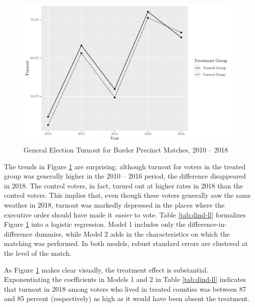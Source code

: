 \documentclass[
  12pt,
]{article}
\begin{document}
\begin{figure}[H]

{\centering \includegraphics{hurricane_michael_files/figure-latex/ll-to-1} 

}

\caption{\label{fig:ll-to}General Election Turnout for Border Precinct Matches, 2010 -- 2018}\label{fig:ll-to}
\end{figure}

The trends in Figure \ref{fig:ll-to} are surprising: although turnout for voters in the treated group was generally higher in the 2010 -- 2016 period, the difference disappeared in 2018. The control voters, in fact, turned out at higher rates in 2018 than the control voters. This implies that, even though these voters generally saw the same weather in 2018, turnout was markedly depressed in the places where the executive order should have made it \emph{easier} to vote. Table \ref{tab:dind-ll} formalizes Figure \ref{fig:ll-to} into a logistic regression. Model 1 includes only the difference-in-difference dummies, while Model 2 adds in the characteristics on which the matching was performed. In both models, robust standard errors are clustered at the level of the match.

\begin{singlespace}


\end{singlespace}

As Figure \ref{fig:ll-to} makes clear visually, the treatment effect is substantial. Exponentiating the coefficients in Models 1 and 2 in Table \ref{tab:dind-ll} indicates that turnout in 2018 among voters who lived in treated counties was between 87 and 85 percent (respectively) as high as it would have been absent the treatment.
\end{document}
